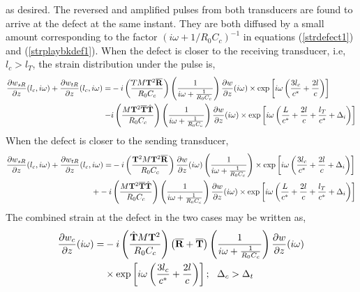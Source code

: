 \documentclass[11pt,letterpaper]{article}%
\begin{document}
as desired.  The reversed and amplified pulses from both
transducers are found to arrive at the defect at the same instant.
They are both diffused by a small amount corresponding to the
factor ${(i\omega + 1/R_0C_c)}^{-1}$ in equations
(\ref{strdefect1}) and (\ref{strplaybkdef1}).  When the defect is
closer to the receiving transducer, i.e, $l_c > l_T$, the strain
distribution under the pulse is,
\begin{align}
\frac{\partial { w}_{sR}}{\partial z}(l_c,i\omega) +
\frac{\partial { w}_{tR}}{\partial z}(l_c,i\omega) =
&-i\left(\frac{{\hat \bf T}M{\bf T}^2\overline{\bf
R}}{R_0C_c}\right)\left(\frac{1}{i\omega +
\frac{1}{R_0C_c}}\right)\frac{\partial { w}}{\partial
z}(i\omega)\times{\exp}\left[{i\omega\left(\frac{3l_c}{c^\ast}+\frac{2l}{c}\right)}\right]\nonumber\\
- &i\left(\frac{M{\bf T}^2\overline{\bf T}{\hat{\bf
T}}}{R_0C_c}\right)\left(\frac{1}{i\omega +
\frac{1}{R_0C_c}}\right)\frac{\partial {w}}{\partial
z}(i\omega)\times{\exp}\left[{i\omega\left(\frac{L}{c^\ast}+
\frac{2l}{c}+ \frac{l_T}{c^\ast} + \Delta_i\right)}\right]
\label{combstrdef1}
\end{align}
When the defect is closer to the sending transducer,
\begin{align}
\frac{\partial { w}_{sR}}{\partial z}(l_c,i\omega) +
\frac{\partial { w}_{tR}}{\partial z}(l_c,i\omega) =
&-i\left(\frac{{\bf T}^2M{\bf T}^2\overline{\bf
R}}{R_0C_c}\right)\frac{\partial {w}}{\partial
z}(i\omega)\left(\frac{1}{i\omega +
\frac{1}{R_0C_c}}\right)\times{\exp}\left[{i\omega\left(\frac{3l_c}{c^\ast}+\frac{2l}{c}+
\Delta_i\right)}\right]\nonumber\\
+-i&\left(\frac{M{\bf T}^2\overline{\bf T}{\hat{\bf
T}}}{R_0C_c}\right)\left(\frac{1}{i\omega +
\frac{1}{R_0C_c}}\right)\frac{\partial {w}}{\partial
z}(i\omega)\times{\exp}\left[{i\omega\left(\frac{L}{c^\ast}+
\frac{2l}{c}+ \frac{l_T}{c^\ast} + \Delta_i\right)}\right]
\label{combstrdef2}
\end{align}
The combined strain at the defect in the two cases may be written
as,
\begin{align}
\frac{\partial {w}_c}{\partial z}(i\omega) =
&-i\left(\frac{{\hat{\bf T}}M{\bf
T}^2}{R_0C_c}\right)\left(\overline{\bf R}+\overline{\bf
T}\right)\left(\frac{1}{i\omega+\frac{1}{R_0C_c}}\right)\frac{\partial
{w}}{\partial z}(i\omega)
\nonumber\\
&\times\exp\left[i\omega\left(\frac{3l_c}{c^\ast}+\frac{2l}{c}\right)\right];\
\ \Delta_c > \Delta_t \label{strtotaldef1}
\end{align}
\end{document}
